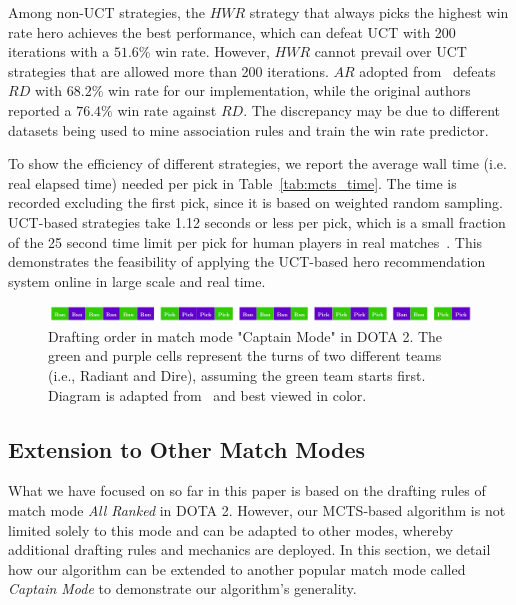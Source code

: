 Among non-UCT strategies, the $HWR$ strategy that always picks the highest win rate hero achieves the best performance, which can defeat UCT with 200 iterations with a $51.6\%$ win rate. However, $HWR$ cannot prevail over UCT strategies that are allowed more than 200 iterations. $AR$ adopted from~\cite{hanke2017reco} defeats $RD$ with $68.2\%$ win rate for our implementation, while the original authors reported a $76.4\%$ win rate against $RD$. The discrepancy may be due to different datasets being used to mine association rules and train the win rate predictor.

To show the efficiency of different strategies, we report the average wall time (i.e. real elapsed time) needed per pick in Table~\ref{tab:mcts_time}. The time is recorded excluding the first pick, since it is based on weighted random sampling. UCT-based strategies take 1.12 seconds or less per pick, which is a small fraction of the 25 second time limit per pick for human players in real matches~\cite{dotapickorder}. This demonstrates the feasibility of applying the UCT-based hero recommendation system online in large scale and real time.


\begin{figure}
\centering
\includegraphics[width=1\textwidth]{Figures/pickorder_captain_mode_my.png}
\caption{Drafting order in match mode "Captain Mode" in DOTA 2. The green and purple cells represent the turns of two different teams (i.e., Radiant and Dire), assuming the green team starts first. Diagram is adapted from~\cite{dotapickorder} and best viewed in color.}
\label{fig:pickorder_captain_mode}
\end{figure}

\subsection{Extension to Other Match Modes}\label{sec:draftart_extension}
What we have focused on so far in this paper is based on the drafting rules of match mode \textit{All Ranked} in DOTA 2. However, our MCTS-based algorithm is not limited solely to this mode and can be adapted to other modes, whereby additional drafting rules and mechanics are deployed. In this section, we detail how our algorithm can be extended to another popular match mode called \textit{Captain Mode} to demonstrate our algorithm's generality. 

